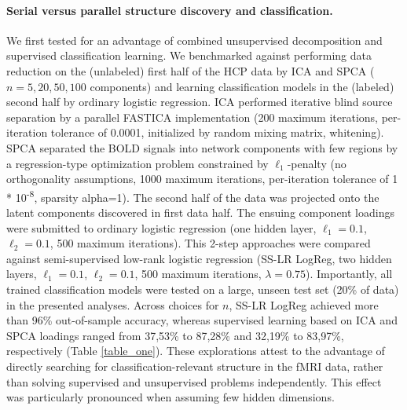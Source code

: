 \documentclass{article} %
\begin{document}
\paragraph{Serial versus parallel structure discovery and classification.}
We first tested for an advantage of combined unsupervised decomposition
and supervised classification learning.
We benchmarked against
performing data reduction on the (unlabeled)
first half of the HCP data by ICA and SPCA ($n=5, 20, 50, 100$ components)
and learning classification models in the (labeled) second half
by ordinary logistic regression.
%
ICA performed iterative blind source separation
by a parallel FASTICA implementation (200 maximum iterations,
per-iteration tolerance of 0.0001,
initialized by random mixing matrix, whitening).
SPCA separated the BOLD signals into
network components with few regions by
a regression-type optimization problem constrained by
$\ell_1$-penalty
(no orthogonality assumptions, 1000 maximum iterations,
per-iteration tolerance of 1 * 10\textsuperscript{-8}, sparsity
alpha=1).
%
The second half of the data was projected onto the
latent components discovered in first data half.
The ensuing component loadings were submitted to ordinary
logistic regression
(one hidden layer, $\ell_1=0.1$, $\ell_2=0.1$, 500 maximum iterations).
%
This 2-step approaches were compared against semi-supervised low-rank
logistic regression
(SS-LR LogReg, two hidden layers, $\ell_1=0.1$, $\ell_2=0.1$,
500 maximum iterations, $\lambda=0.75$).
Importantly, all trained classification models were tested
on a large, unseen test set (20\% of data) in the presented analyses.
%
Across choices for $n$, SS-LR LogReg
achieved more than 96\% out-of-sample accuracy, whereas
supervised learning based on ICA and SPCA loadings
ranged from 37,53\% to 87,28\%
and
32,19\% to 83,97\%, respectively (Table \ref{table_one}).
%
These explorations attest to the advantage of directly searching for
classification-relevant structure in the fMRI data,
rather than solving supervised and unsupervised problems independently.
This effect was particularly pronounced when assuming few hidden dimensions.

\begin{table}[h]
 \centering
 \vspace{-0.2cm}
 \caption{Serial versus parallel dimensionality reduction and classification}
 \label{table_one}
 \end{table}
\end{document}
